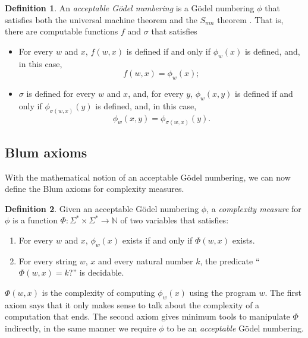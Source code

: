 \documentclass[12pt]{article}
\theoremstyle{definition}
\newtheorem{definition}{Definition}
\begin{document}
\begin{definition}
    An \emph{acceptable Gödel numbering}
    is a Gödel numbering $\phi$
    that satisfies both the universal machine theorem
    and the $S_{mn}$ theorem \cite[p.~41]{Rogers1987}.
    That is, there are computable functions $f$ and $\sigma$
    that satisfies
    \begin{itemize}
        \item For every $w$ and $x$,
            $f(w, x)$ is defined if and only if $\phi_w(x)$ is defined,
            and, in this case,
            \begin{equation*}
                f(w, x) = \phi_w(x);
            \end{equation*}
        \item $\sigma$ is defined for every $w$ and $x$,
            and, for every $y$,
            $\phi_w(x, y)$ is defined if and only if $\phi_{\sigma(w, x)}(y)$ is defined,
            and, in this case,
            \begin{equation*}
                \phi_w(x, y) = \phi_{\sigma(w, x)}(y).
            \end{equation*}
    \end{itemize}
\end{definition}

\subsection{Blum axioms}
\label{sec:blum-axioms}

With the mathematical notion of an acceptable Gödel numbering,
we can now define the Blum axioms for complexity measures.

\begin{definition}
    Given an acceptable Gödel numbering $\phi$,
    a \emph{complexity measure} for $\phi$
    is a function $\Phi:\Sigma^* \times \Sigma^* \to \mathbb N$ of two variables
    that satisfies: \cite[p.~324]{Blum1967}
    \begin{enumerate}
        \item For every $w$ and $x$,
            $\phi_w(x)$ exists if and only if $\Phi(w, x)$ exists.
        \item For every string $w$, $x$ and every natural number $k$,
            the predicate ``$\Phi(w, x) = k$?'' is decidable.
    \end{enumerate}
\end{definition}

$\Phi(w, x)$ is the complexity of computing $\phi_w(x)$
using the program $w$.
The first axiom says that it only makes sense
to talk about the complexity of a computation that ends.
The second axiom gives minimum tools to manipulate $\Phi$ indirectly,
in the same manner we require $\phi$ to be an \emph{acceptable} Gödel numbering.
\end{document}
